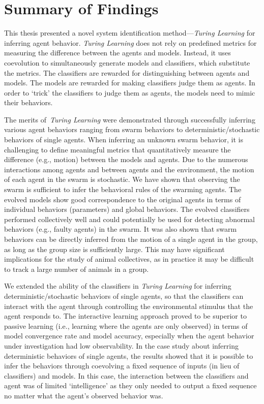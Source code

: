 \section{Summary of Findings}

This thesis presented a novel system identification method---\textit{Turing Learning} for inferring agent behavior. \textit{Turing Learning} does not rely on predefined metrics for measuring the difference between the agents and models. Instead, it uses coevolution to simultaneously generate models and classifiers, which substitute the metrics. The classifiers are rewarded for distinguishing between agents and models. The models are rewarded for making classifiers judge them as agents. In order to `trick' the classifiers to judge them as agents, the models need to mimic their behaviors. 

The merits of~\textit{Turing Learning} were demonstrated through successfully inferring various agent behaviors ranging from swarm behaviors to deterministic/stochastic behaviors of single agents. When inferring an unknown swarm behavior, it is challenging to define meaningful metrics that quantitatively measure the difference (e.g., motion) between the models and agents. Due to the numerous interactions among agents and between agents and the environment, the motion of each agent in the swarm is stochastic. We have shown that observing the swarm is sufficient to infer the behavioral rules of the swarming agents. The evolved models show good correspondence to the original agents in terms of individual behaviors (parameters) and global behaviors. The evolved classifiers performed collectively well and could potentially be used for detecting abnormal behaviors (e.g., faulty agents) in the swarm. It was also shown that swarm behaviors can be directly inferred from the motion of a single agent in the group, as long as the group size is sufficiently large. This may have significant implications for the study of animal collectives, as in practice it may be difficult to track a large number of animals in a group. 

We extended the ability of the classifiers in \textit{Turing Learning} for inferring deterministic/stochastic behaviors of single agents, so that the classifiers can interact with the agent through controlling the environmental stimulus that the agent responds to. The interactive learning approach proved to be superior to passive learning (i.e., learning where the agents are only observed) in terms of model convergence rate and model accuracy, especially when the agent behavior under investigation had low observability. In the case study about inferring deterministic behaviors of single agents, the results showed that it is possible to infer the behaviors through coevolving a fixed sequence of inputs (in lieu of classifiers) and models. In this case, the interaction between the classifiers and agent was of limited `intelligence' as they only needed to output a fixed sequence no matter what the agent's observed behavior was. 

